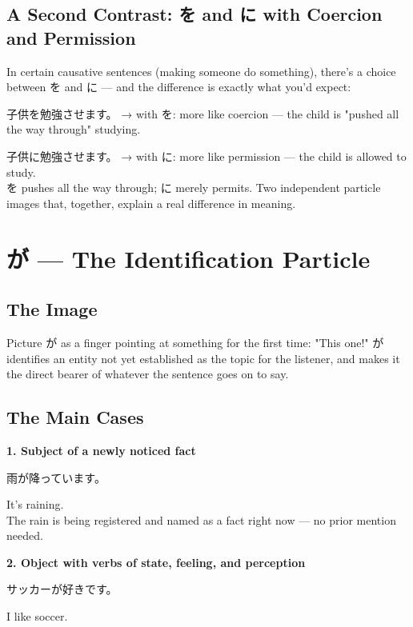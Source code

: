 \documentclass[12pt]{book}
\begin{document}
\section*{A Second Contrast: を and に with Coercion and Permission}

In certain causative sentences (making someone do something), there's a choice between を and に — and the difference is exactly what you'd expect:

\par\quad 子供を勉強させます。 → with を: more like coercion — the child is "pushed all the way through" studying.\\
\par\quad 子供に勉強させます。 → with に: more like permission — the child is allowed to study.\\

を pushes all the way through; に merely permits. Two independent particle images that, together, explain a real difference in meaning.


\chapter{が — The Identification Particle}

\section*{The Image}

Picture が as a finger pointing at something for the first time: "This one!" が identifies an entity not yet established as the topic for the listener, and makes it the direct bearer of whatever the sentence goes on to say.

\section*{The Main Cases}

\textbf{1. Subject of a newly noticed fact}
\par\quad 雨が降っています。\\
\par\quad It's raining.\\

The rain is being registered and named as a fact right now — no prior mention needed.

\textbf{2. Object with verbs of state, feeling, and perception}
\par\quad サッカーが好きです。\\
\par\quad I like soccer.\\
\end{document}
